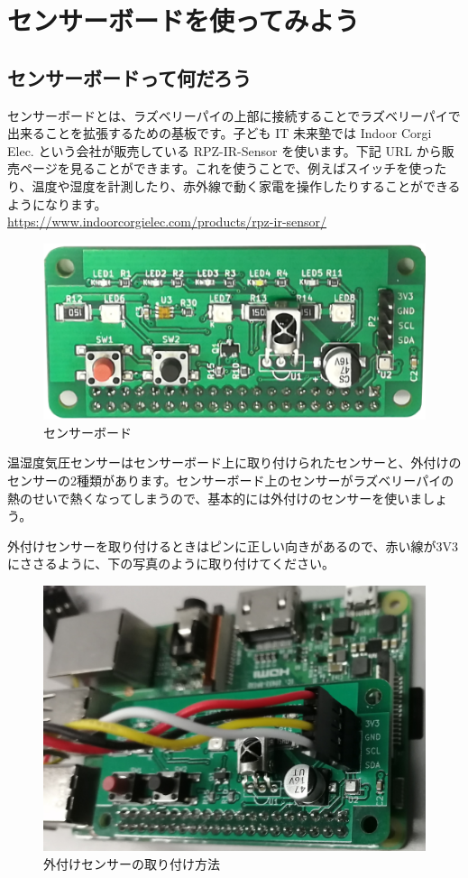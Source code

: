\section{センサーボードを使ってみよう}
\subsection{センサーボードって何だろう}

センサーボードとは、ラズベリーパイの上部に接続することでラズベリーパイで出来ることを拡張するための基板です。子ども IT 未来塾では Indoor Corgi Elec. という会社が販売している RPZ-IR-Sensor を使います。下記 URL から販売ページを見ることができます。これを使うことで、例えばスイッチを使ったり、温度や湿度を計測したり、赤外線で動く家電を操作したりすることができるようになります。\\
\url{https://www.indoorcorgielec.com/products/rpz-ir-sensor/}\\

\begin{figure}[H]
    \centering
    \includegraphics[width=0.6\linewidth]{images/chap03/text03-img030.png}
    \caption{センサーボード}
\end{figure}

温湿度気圧センサーはセンサーボード上に取り付けられたセンサーと、外付けのセンサーの2種類があります。センサーボード上のセンサーがラズベリーパイの熱のせいで熱くなってしまうので、基本的には外付けのセンサーを使いましょう。

外付けセンサーを取り付けるときはピンに正しい向きがあるので、赤い線が3V3にささるように、下の写真のように取り付けてください。

\begin{figure}[H]
    \centering
    \includegraphics[width=0.6\linewidth]{images/chap03/text03-img034.jpg}
    \caption{外付けセンサーの取り付け方法}
\end{figure}

